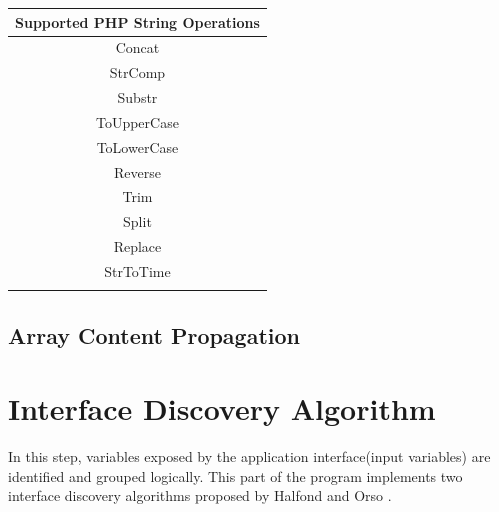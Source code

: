 \begin{table}
\begin{tabular}{c}
Supported PHP String Operations \\
\hline
Concat \\
StrComp \\
Substr \\
ToUpperCase \\
ToLowerCase \\
Reverse \\
Trim \\
Split \\
Replace \\
StrToTime \\
\label{Supported PHP string operations}
\end{tabular}
\end{table}

\subsection{Array Content Propagation}
\blindtext

\section{Interface Discovery Algorithm}
In this step, variables exposed by the application interface(input variables) are identified and grouped logically. This part of the program implements two interface discovery algorithms proposed by Halfond and Orso \cite{ref3}.

